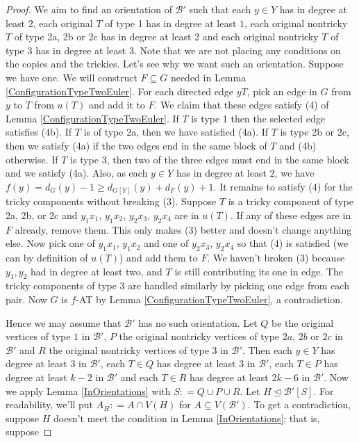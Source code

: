 \documentclass[12pt]{article}
\theoremstyle{plain}
\theoremstyle{definition}
\theoremstyle{remark}
\newcommand{\fancy}[1]{\mathcal{#1}}
\newcommand{\B}{\fancy{B}}
\newcommand{\DefinedAs}{\mathrel{\mathop:}=}
\begin{document}
\begin{proof}
We aim to find an orientation of $\B'$ such that each $y \in Y$ has in degree at least $2$, each original $T$ of type 1 has in degree at least $1$, each original nontricky $T$ of type 2a, 2b or 2c has in degree at least $2$ and each original nontricky $T$ of type 3 has in degree at least $3$.  Note that we are not placing any conditions on the copies and the trickies.  Let's see why we want such an orientation.  Suppose we have one.  We will construct $F \subseteq G$ needed in Lemma \ref{ConfigurationTypeTwoEuler}.  For each directed edge $yT$, pick an edge in $G$ from $y$ to $T$ from $u(T)$ and add it to $F$. We claim that these edges satisfy (4) of Lemma \ref{ConfigurationTypeTwoEuler}.  If $T$ is type 1 then the selected edge satisfies (4b).  If $T$ is of type 2a, then we have satisfied (4a).  If $T$ is type 2b or 2c, then we satisfy (4a) if the two edges end in the same block of $T$ and (4b) otherwise.  If $T$ is type 3, then two of the three edges must end in the same block and we satisfy (4a). Also, as each $y \in Y$ has in degree at least $2$, we have $f(y) = d_G(y) - 1 \geq d_{G[Y]}(y) + d_F(y) + 1$.  It remains to satisfy (4) for the tricky components without breaking (3).  Suppose $T$ is a tricky component of type 2a, 2b, or 2c and $y_1x_1$, $y_1x_2$, $y_2x_3$, $y_2x_4$ are in $u(T)$.  If any of these edges are in $F$ already, remove them.  This only makes (3) better and doesn't change anything else.  Now pick one of $y_1x_1$, $y_1x_2$ and one of $y_2x_3$, $y_2x_4$ so that (4) is satisfied (we can by definition of $u(T)$) and add them to $F$.  We haven't broken (3) because $y_1, y_2$ had in degree at least two, and $T$ is still contributing its one in edge. The tricky components of type 3 are handled similarly by picking one edge from each pair. Now $G$ is $f$-AT by Lemma \ref{ConfigurationTypeTwoEuler}, a contradiction.

Hence we may assume that $\B'$ has no such orientation. Let $Q$ be the original vertices of type $1$ in $\B'$, $P$ the original nontricky vertices of type $2a$, $2b$ or $2c$ in $\B'$ and $R$ the original nontricky vertices of type $3$ in $\B'$.  Then each $y \in Y$ has degree at least $3$ in $\B'$, each $T \in Q$ has degree at least $3$ in $\B'$, each $T \in P$ has degree at least $k-2$ in $\B'$ and each $T \in R$ has degree at least $2k-6$ in $\B'$.  Now we apply Lemma \ref{InOrientations} with $S \DefinedAs Q \cup P \cup R$.  Let $H \unlhd \B'[S]$.  For readability, we'll put $A_H \DefinedAs A \cap V(H)$ for $A \subseteq V(\B')$.  To get a contradiction, suppose $H$ doesn't meet the condition in Lemma \ref{InOrientations}; that is, suppose 


\end{proof}
\end{document}
